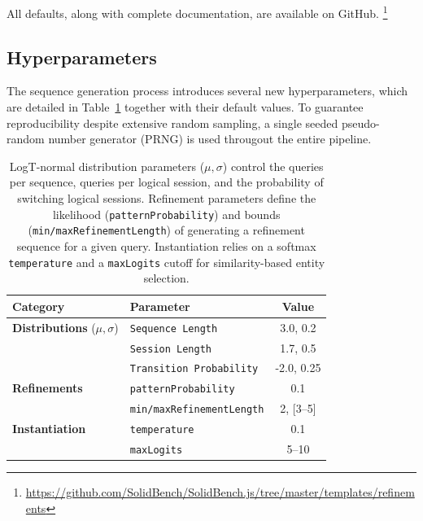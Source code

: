 All defaults, along with 
complete documentation, are available on GitHub.%
\footnote{\url{https://github.com/SolidBench/SolidBench.js/tree/master/templates/refinements}}


\subsection{Hyperparameters}

The sequence generation process introduces several new hyperparameters, 
which are detailed in Table~\ref{tab:generation_hyperparameters} together with their default values. 
To guarantee reproducibility despite extensive random sampling, 
a single seeded pseudo-random number generator (PRNG) is used througout the 
entire pipeline.

\begin{table}[htbp]
    \centering
    \caption{LogT-normal distribution parameters ($\mu, \sigma$) control the queries per sequence, 
    queries per logical session, and the probability of switching logical sessions. 
    Refinement parameters define the likelihood (\texttt{patternProbability}) 
    and bounds (\texttt{min/maxRefinementLength}) of generating a refinement sequence for a given query. 
    Instantiation relies on a softmax \texttt{temperature} and a \texttt{maxLogits} 
    cutoff for similarity-based entity selection.}
    \label{tab:generation_hyperparameters}
    \begin{tabular}{l l c}
        \toprule
        \textbf{Category} & \textbf{Parameter} & \textbf{Value} \\
        \midrule
        \textbf{Distributions} ($\mu, \sigma$) 
        & \texttt{Sequence Length} & 3.0, 0.2 \\
        & \texttt{Session Length} & 1.7, 0.5 \\
        & \texttt{Transition Probability} & -2.0, 0.25 \\
        \addlinespace
        \textbf{Refinements} 
        & \texttt{patternProbability} & 0.1 \\
        & \texttt{min/maxRefinementLength} & 2, [3--5] \\
        \addlinespace
        \textbf{Instantiation} 
        & \texttt{temperature} & 0.1 \\
        & \texttt{maxLogits} & 5--10 \\
        \bottomrule
    \end{tabular}
\end{table}

